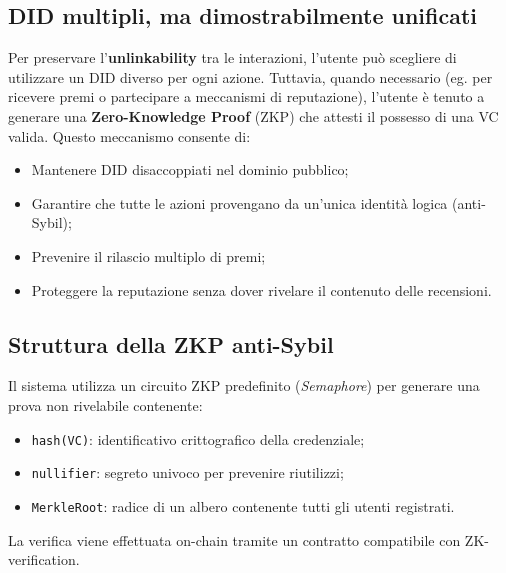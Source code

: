        \subsection{DID multipli, ma dimostrabilmente unificati}
            Per preservare l'\textbf{unlinkability} tra le interazioni, l'utente può scegliere di utilizzare un DID diverso per ogni azione. Tuttavia, quando necessario (eg. per ricevere premi o partecipare a meccanismi di reputazione), l'utente è tenuto a generare una \textbf{Zero-Knowledge Proof} (ZKP) che attesti il possesso di una VC valida.
            Questo meccanismo consente di:
                \begin{itemize}
                    \item Mantenere DID disaccoppiati nel dominio pubblico;
                    
                    \item Garantire che tutte le azioni provengano da un'unica identità logica (anti-Sybil);
                    
                    \item Prevenire il rilascio multiplo di premi;

                    \item Proteggere la reputazione senza dover rivelare il contenuto delle recensioni.
                \end{itemize}

        \subsection{Struttura della ZKP anti-Sybil}
            Il sistema utilizza un circuito ZKP predefinito (\textit{Semaphore}) per generare una prova non rivelabile contenente:
                \begin{itemize}
                    \item \texttt{hash(VC)}: identificativo crittografico della credenziale;
    
                    \item \texttt{nullifier}: segreto univoco per prevenire riutilizzi;
    
                    \item \texttt{MerkleRoot}: radice di un albero contenente tutti gli utenti registrati.
                \end{itemize}

            \noindent La verifica viene effettuata on-chain tramite un contratto compatibile con ZK-verification.

